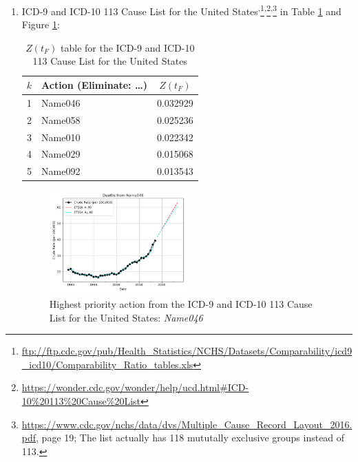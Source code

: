 \documentclass[10pt, a4paper, twocolumn]{IEEEconf}
\begin{document}
\begin{enumerate}
  \item ICD-9 and ICD-10 113 Cause List for the United States\cite{nbermortality,anderson2001comparability,icdcomparabilityratios,centers2017underlying}\textsuperscript{,}\footnote{\scriptsize{\url{ftp://ftp.cdc.gov/pub/Health_Statistics/NCHS/Datasets/Comparability/icd9_icd10/Comparability_Ratio_tables.xls}}}\textsuperscript{,}\footnote{\scriptsize{\url{https://wonder.cdc.gov/wonder/help/ucd.html\#ICD-10\%20113\%20Cause\%20List}}}\textsuperscript{,}\footnote{\scriptsize{\url{https://www.cdc.gov/nchs/data/dvs/Multiple_Cause_Record_Layout_2016.pdf}, page 19; The list actually has 118 mututally exclusive groups instead of 113.}} in Table \ref{table:ztable2} and Figure \ref{fig:k2}:
    \begin{table}[H]
      \centering
      \begin{tabular}{clc}
        \toprule
          $k$ & Action (Eliminate: \ldots) & $Z(t_F)$ \\
        \midrule
          1   & Name046 & 0.032929 \\
          2   & Name058 & 0.025236 \\
          3   & Name010 & 0.022342 \\
          4   & Name029 & 0.015068 \\
          5   & Name092 & 0.013543 \\
        \bottomrule
      \end{tabular}
      \caption{$Z(t_F)$ table for the ICD-9 and ICD-10 113 Cause List for the United States}
      \label{table:ztable2}
    \end{table}
    \begin{figure}[H]
      \centering
      \includegraphics[width=0.5\textwidth]{results/US_ICD_113_SELECTED_CAUSES_LEAVES/Name046_ets.png}
      \caption{Highest priority action from the ICD-9 and ICD-10 113 Cause List for the United States: \textit{Name046}}\label{fig:k2}
    \end{figure}


\end{enumerate}
\end{document}
